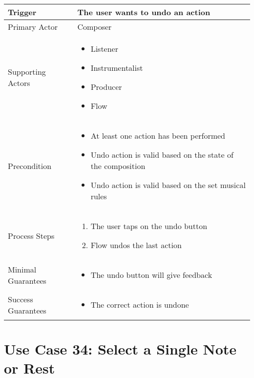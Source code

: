   \begin{tabularx}{\textwidth}{|X|X|}
  \hline
  Trigger & 
  The user wants to undo an action \\
  \hline
  Primary Actor & 
  Composer \\
  \hline
  Supporting Actors & 
  \begin{itemize}
  \item Listener
  \item Instrumentalist
  \item Producer
  \item Flow
  \end{itemize} \\
  \hline
  Precondition & 
  \begin{itemize}
  \item At least one action has been performed
  \item Undo action is valid based on the state of the composition
  \item Undo action is valid based on the set musical rules
  \end{itemize} \\
  \hline
  Process Steps & 
  \begin{enumerate}
  \item The user taps on the undo button
  \item Flow undos the last action
  \end{enumerate} \\
  \hline
  Minimal Guarantees & 
  \begin{itemize}
    \item The undo button will give feedback
  \end{itemize} \\
  \hline
  Success Guarantees & 
  \begin{itemize}
    \item The correct action is undone
  \end{itemize} \\
  \hline
  \end{tabularx}

  \section{Use Case 34: Select a Single Note or Rest}


